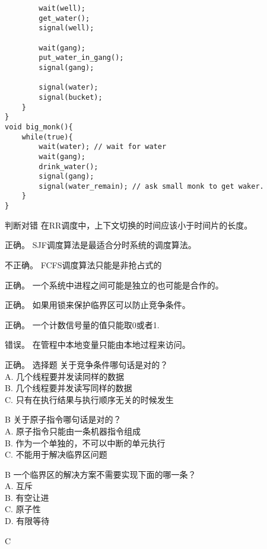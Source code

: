 \documentclass{ctexart}
\begin{document}
\begin{outline}[enumerate]
\begin{verbatim}
        wait(well);
        get_water();
        signal(well);

        wait(gang);
        put_water_in_gang();
        signal(gang);

        signal(water);
        signal(bucket);
    }
}
void big_monk(){
    while(true){
        wait(water); // wait for water
        wait(gang);
        drink_water();
        signal(gang);
        signal(water_remain); // ask small monk to get waker.
    }
}
\end{verbatim}
    \1 判断对错
        \2 在RR调度中，上下文切换的时间应该小于时间片的长度。

            正确。
        \2 SJF调度算法是最适合分时系统的调度算法。

            不正确。
        \2 FCFS调度算法只能是非抢占式的

            正确。
        \2 一个系统中进程之间可能是独立的也可能是合作的。

            正确。
        \2 如果用锁来保护临界区可以防止竞争条件。

            正确。
        \2 一个计数信号量的值只能取0或者1.

            错误。
        \2 在管程中本地变量只能由本地过程来访问。

            正确。
    \1 选择题
        \2 关于竞争条件哪句话是对的？ \\
            A. 几个线程要并发读同样的数据 \\
            B. 几个线程要并发读写同样的数据 \\
            C. 只有在执行结果与执行顺序无关的时候发生

        B
        \2 关于原子指令哪句话是对的？ \\
            A. 原子指令只能由一条机器指令组成 \\
            B. 作为一个单独的，不可以中断的单元执行 \\
            C. 不能用于解决临界区问题

            B
        \2 一个临界区的解决方案不需要实现下面的哪一条？ \\
            A. 互斥 \\
            B. 有空让进 \\
            C. 原子性 \\
            D. 有限等待

            C
\end{outline}
\end{document}
